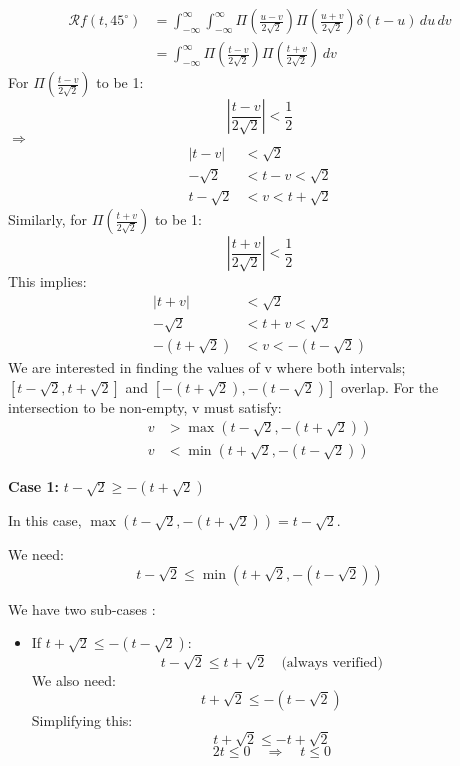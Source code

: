 \documentclass[12pt,twoside]{article}
\begin{document}
\begin{enumerate}
\begin{align*}
\mathcal{R}f(t, 45^\circ) &= \int_{-\infty}^{\infty} \int_{-\infty}^{\infty} \Pi\left(\frac{u-v}{2\sqrt{2}}\right) \Pi\left(\frac{u+v}{2\sqrt{2}}\right) \delta(t - u) \, du \, dv \\
&= \int_{-\infty}^{\infty} \Pi\left(\frac{t-v}{2\sqrt{2}}\right) \Pi\left(\frac{t+v}{2\sqrt{2}}\right) \, dv 
\end{align*}
For $ \Pi\left(\frac{t-v}{2\sqrt{2}}\right) $ to be 1:
\[
\left| \frac{t-v}{2\sqrt{2}} \right| < \frac{1}{2}
\]
$\Rightarrow$
\begin{align*}
\left| t-v \right| &< \sqrt{2} \\
-\sqrt{2} &< t - v < \sqrt{2} \\
t - \sqrt{2} &< v < t + \sqrt{2}
\end{align*}
Similarly, for $ \Pi\left(\frac{t+v}{2\sqrt{2}}\right) $ to be 1:
\[
\left| \frac{t+v}{2\sqrt{2}} \right| < \frac{1}{2}
\]
This implies:
\begin{align*}
\left| t+v \right| &< \sqrt{2} \\
-\sqrt{2} &< t + v < \sqrt{2} \\
 - \left( t + \sqrt{2} \right) &< v <  - \left( t - \sqrt{2} \right) 
\end{align*}
We are interested in finding the values of v where both intervals; $\left[t - \sqrt{2}  , t + \sqrt{2} \right]$ and $\left[- (t + \sqrt{2})  , - (t - \sqrt{2}) \right]$ overlap.
For the intersection to be non-empty, v  must satisfy:
\begin{align*}
v &> \max(t -  \sqrt{2} , -(t +  \sqrt{2} )) \\
v &< \min(t +  \sqrt{2} , -(t -  \sqrt{2} ))
\end{align*}


\textbf{Case 1: } \( t - \sqrt{2} \geq -(t + \sqrt{2}) \)

In this case, \( \max(t - \sqrt{2}, -(t + \sqrt{2})) = t - \sqrt{2} \).

We need:
\[
t - \sqrt{2} \leq \min(t + \sqrt{2}, -(t - \sqrt{2}))
\]

We have two sub-cases :

\begin{itemize}
    \item If \( t + \sqrt{2} \leq -(t - \sqrt{2}) \):
    \[
    t - \sqrt{2} \leq t + \sqrt{2} \quad \text{(always verified)}
    \]
   We also need:
    \[
    t + \sqrt{2} \leq -(t - \sqrt{2})
    \]
    Simplifying this:
    \[
    t + \sqrt{2} \leq -t + \sqrt{2}
    \]
    \[
    2t \leq 0 \quad \Rightarrow \quad t \leq 0
    \]


\end{itemize}
\end{enumerate}
\end{document}
